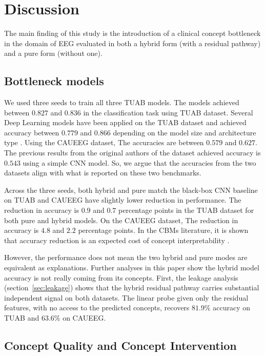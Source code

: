 \documentclass[journal,twoside,web]{ieeecolor}
\begin{document}
\section{Discussion}

The main finding of this study is the introduction of a clinical concept bottleneck in the domain of EEG evaluated in both a hybrid form (with a residual pathway) and a pure form (without one). 

\subsection{Bottleneck models}

We used three seeds to train all three TUAB models. The models achieved between $0.827$ and $0.836$ in the classification task using TUAB dataset. Several Deep Learning models have been applied on the TUAB dataset and achieved accuracy between $0.779$ and $0.866$ depending on the model size and architecture type \cite{kiessner2023extended}. Using the CAUEEG dataset, The accuracies are between $0.579$ and $0.627$. The previous results from the original authors of the dataset \cite{kim2023caueeg} achieved accuracy is $0.543$ using a simple CNN model. So, we argue that the accuracies from the two datasets align with what is reported on these two benchmarks.

Across the three seeds, both hybrid and pure match the black-box CNN baseline on TUAB and CAUEEG have slightly lower reduction in performance. The reduction in accuracy is $0.9$ and $0.7$ percentage points in the TUAB dataset for both pure and hybrid models. On the CAUEEG dataset, The reduction in accuracy is $4.8$ and $2.2$ percentage points. In the CBMs literature, it is shown that accuracy reduction is an expected cost of concept interpretability \cite{koh2020, mahinpei2021}. 

However, the performance does not mean the two hybrid and pure modes are equivalent as explanations. Further analyses in this paper show the hybrid model accuracy is not really coming from its concepts. First, the leakage analysis (section~\ref{sec:leakage}) shows that the hybrid residual pathway carries substantial independent signal on both datasets. The linear probe given only the residual features, with no access to the predicted concepts, recovers $81.9\%$ accuracy on TUAB and $63.6\%$ on CAUEEG. 


\subsection{Concept Quality and Concept Intervention}
\end{document}
